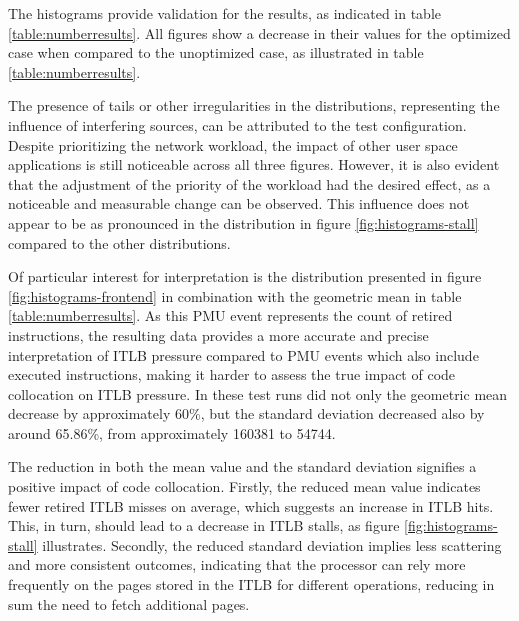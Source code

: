 The histograms provide validation for the results, as indicated in table \ref{table:numberresults}. All figures show a decrease in their values for the optimized case when compared to the unoptimized case, as illustrated in table \ref{table:numberresults}.

The presence of tails or other irregularities in the distributions, representing the influence of interfering sources, can be attributed to the test configuration. Despite prioritizing the network workload, the impact of other user space applications is still noticeable across all three figures. However, it is also evident that the adjustment of the priority of the workload had the desired effect, as a noticeable and measurable change can be observed. This influence does not appear to be as pronounced in the distribution in figure \ref{fig:histograms-stall} compared to the other distributions.

Of particular interest for interpretation is the distribution presented in figure \ref{fig:histograms-frontend} in combination with the geometric mean in table \ref{table:numberresults}. As this PMU event represents the count of retired instructions, the resulting data provides a more accurate and precise interpretation of ITLB pressure compared to PMU events which also include executed instructions, making it harder to assess the true impact of code collocation on ITLB pressure. In these test runs did not only the geometric mean decrease by approximately 60\%, but the standard deviation decreased also by around 65.86\%, from approximately 160381 to 54744.

\enlargethispage{\baselineskip}
The reduction in both the mean value and the standard deviation signifies a positive impact of code collocation. Firstly, the reduced mean value indicates fewer retired ITLB misses on average, which suggests an increase in ITLB hits. This, in turn, should lead to a decrease in ITLB stalls, as figure \ref{fig:histograms-stall} illustrates. Secondly, the reduced standard deviation implies less scattering and more consistent outcomes, indicating that the processor can rely more frequently on the pages stored in the ITLB for different operations, reducing in sum the need to fetch additional pages.


